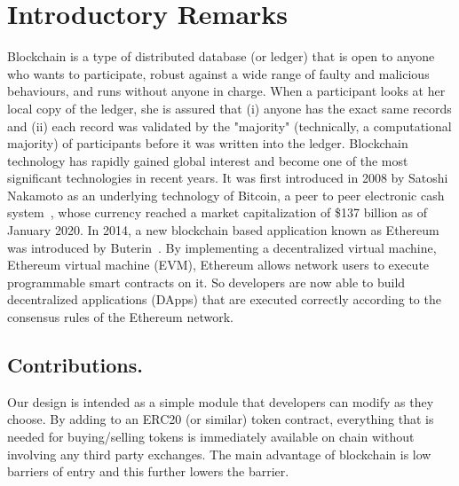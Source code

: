 



\section{Introductory Remarks}

Blockchain is a type of distributed database (or ledger) that is open to anyone who wants to participate, robust against a wide range of faulty and malicious behaviours, and runs without anyone in charge. When a participant looks at her local copy of the ledger, she is assured that (i) anyone has the exact same records and (ii) each record was validated by the "majority" (technically, a computational majority) of participants before it was written into the ledger. Blockchain technology has rapidly gained global interest and become one of the most significant technologies in recent years. It was first introduced in 2008 by Satoshi Nakamoto as an underlying technology of Bitcoin, a peer to peer electronic cash system~\cite{nakamoto2019bitcoin}, whose currency reached a market capitalization of \$137 billion as of January 2020. In 2014, a new blockchain based application known as Ethereum was introduced by Buterin~\cite{buterin2014next}. By implementing a decentralized virtual machine, Ethereum virtual machine (EVM), Ethereum allows network users to execute programmable smart contracts on it. So developers are now able to build decentralized applications (DApps) that are executed correctly according to the consensus rules of the Ethereum network. 

\subsection*{Contributions.}
Our design \cm is intended as a simple module that developers can modify as they choose. By adding \cm to an ERC20 (or similar) token contract, everything that is needed for buying/selling tokens is immediately available on chain without involving any third party exchanges. The main advantage of blockchain is low barriers of entry and this further lowers the barrier. 




